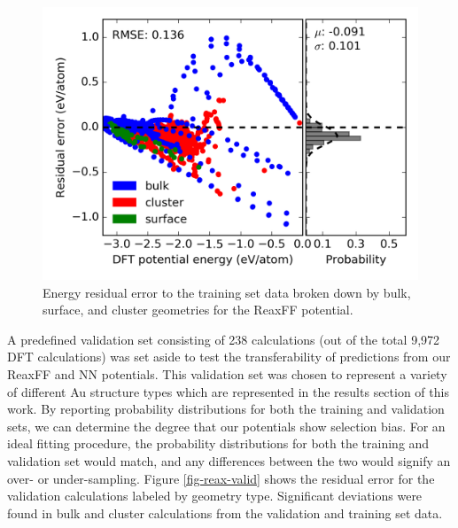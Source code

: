 \documentclass[12pt,oneside]{cmuthesis}
\begin{document}
\begin{figure}[h]
\centering
\includegraphics[width=5.5in]{./images/fig-reax-train.png}
\caption{\label{fig-reax-train}
Energy residual error to the training set data broken down by bulk, surface, and cluster geometries for the ReaxFF potential.}
\end{figure}

A predefined validation set consisting of 238 calculations (out of the total 9,972 DFT calculations) was set aside to test the transferability of predictions from our ReaxFF and NN potentials. This validation set was chosen to represent a variety of different Au structure types which are represented in the results section of this work. By reporting probability distributions for both the training and validation sets, we can determine the degree that our potentials show selection bias. For an ideal fitting procedure, the probability distributions for both the training and validation set would match, and any differences between the two would signify an over- or under-sampling. Figure \ref{fig-reax-valid} shows the residual error for the validation calculations labeled by geometry type. Significant deviations were found in bulk and cluster calculations from the validation and training set data.
\end{document}
